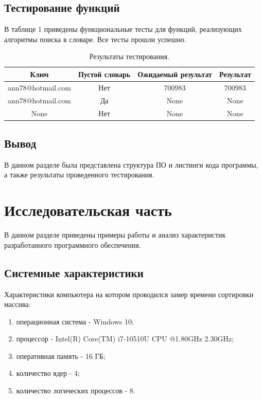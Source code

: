 \documentclass[a4paper, 12pt]{article}
\begin{document}
	\subsection{Тестирование функций}
	\hspace*{5mm} В таблице 1 приведены функциональные тесты для функций, реализующих алгоритмы поиска в словаре.
	Все тесты прошли успешно.\\
	\begin{table}[h]
		\centering
		\caption{Результаты тестирования.\\}
		\begin{tabular}{ | c | c | c | c |}
			\hline
			Ключ & Пустой словарь & Ожидаемый результат & Результат  \\ \hline
			ann78@hotmail.com & Нет & 700983 &  700983\\ \hline
			ann78@hotmail.com & Да & None &  None\\ \hline
			None & Нет & None &  None\\ \hline
		\end{tabular}
	\end{table}
	
	\subsection{Вывод}
	\hspace*{5mm} В данном разделе была представлена структура ПО и листинги кода программы, а также результаты проведенного тестирования. 
	

\clearpage
\newpage
\section{Исследовательская часть }

	\hspace*{5mm} В данном разделе приведены примеры работы и анализ характеристик разработанного программного обеспечения.
	\subsection{Системные характеристики}
	Характеристики компьютера на котором проводился замер времени сортировки массива:
	\begin{enumerate}
		\item операционная система - Windows 10;
		\item процессор - Intel(R) Core(TM) i7-10510U CPU @1.80GHz 2.30GHz;
		\item оперативная память - 16 ГБ;
		\item количество ядер - 4;
		\item количество логических процессов - 8.
	\end{enumerate}
\end{document}
